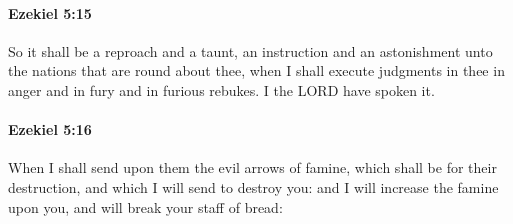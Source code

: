 		\paragraph{Ezekiel 5:15} %
			\label{EZEKIEL-5-15}

			So it shall be a reproach and a taunt, an instruction and an astonishment unto the nations that are round about thee, when I shall execute judgments in thee in anger and in fury and in furious rebukes. I the LORD have spoken it.


		\paragraph{Ezekiel 5:16} %
			\label{EZEKIEL-5-16}

			When I shall send upon them the evil arrows of famine, which shall be for their destruction, and which I will send to destroy you: and I will increase the famine upon you, and will break your staff of bread:

